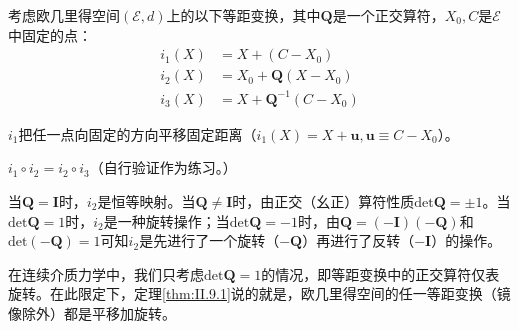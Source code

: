 \documentclass[main.tex]{subfiles}
\begin{document}
\begin{example}
考虑欧几里得空间$\left(\mathcal{E},d\right)$上的以下等距变换，其中$\mathbf{Q}$是一个正交算符，$X_0,C$是$\mathcal{E}$中固定的点：
\begin{align*}
    i_1\left(X\right)&=X+\left(C-X_0\right)\\
    i_2\left(X\right)&=X_0+\mathbf{Q}\left(X-X_0\right)\\
    i_3\left(X\right)&=X+\mathbf{Q}^{-1}\left(C-X_0\right)
\end{align*}

$i_1$把任一点向固定的方向平移固定距离（$i_1\left(X\right)=X+\mathbf{u},\mathbf{u}\equiv C-X_0$）。

$i_1\circ i_2=i_2\circ i_3$（自行验证作为练习。）

当$\mathbf{Q}=\mathbf{I}$时，$i_2$是恒等映射。当$\mathbf{Q}\neq\mathbf{I}$时，由正交（幺正）算符性质$\mathrm{det}\mathbf{Q}=\pm 1$。当$\mathrm{det}\mathbf{Q}=1$时，$i_2$是一种旋转操作；当$\mathrm{det}\mathbf{Q}=-1$时，由$\mathbf{Q}=\left(-\mathbf{I}\right)\left(-\mathbf{Q}\right)$和$\mathrm{det}\left(-\mathbf{Q}\right)=1$可知$i_2$是先进行了一个旋转（$-\mathbf{Q}$）再进行了反转（$-\mathbf{I}$）的操作。
\end{example}

在连续介质力学中，我们只考虑$\mathrm{det}\mathbf{Q}=1$的情况，即等距变换中的正交算符仅表旋转。在此限定下，定理\ref{thm:II.9.1}说的就是，欧几里得空间的任一等距变换（镜像除外）都是平移加旋转。
\end{document}
